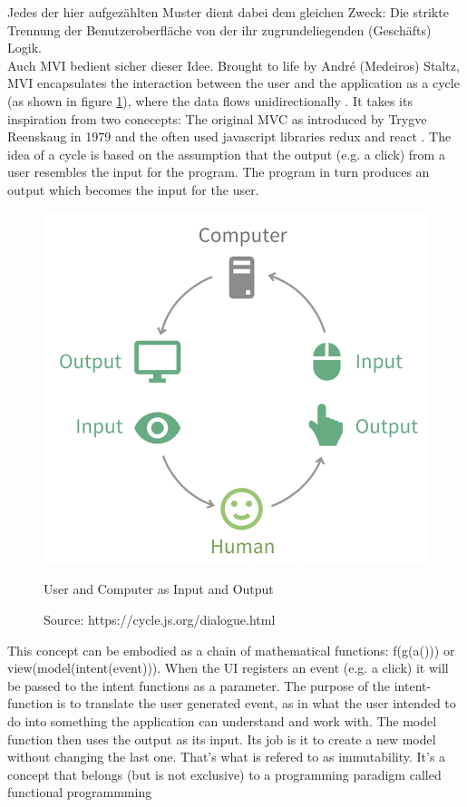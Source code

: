 Jedes der hier aufgezählten Muster dient dabei dem gleichen Zweck: Die strikte Trennung der Benutzeroberfläche von der ihr zugrundeliegenden (Geschäfts) Logik. 
\\
Auch MVI bedient sicher dieser Idee. Brought to life by André (Medeiros) Staltz, MVI encapsulates the interaction between the user and the application as a cycle 
(as shown in figure 
\ref{fig:userComputerInputOutput}), 
where the data flows unidirectionally 
\cite{unidirectionalDataFlowRedux}.
It takes its inspiration from two conecepts: The original MVC as introduced by Trygve Reenskaug in 1979 
\cite{wikipediaTrygveReenskaug} 
and the often used javascript libraries redux 
\cite{redux} 
and react 
\cite{react}. 
The idea of a cycle is based on the assumption that the output (e.g. a click) from a user resembles the input for the program. The program in turn produces an output 
which becomes the input for the user.
\begin{figure}[ht]
    \centering
    \includegraphics[height=0.5\textwidth]{./images/mvi-cycle}
    \caption{User and Computer as Input and Output}
    \caption*{Source: https://cycle.js.org/dialogue.html}
    \label{fig:userComputerInputOutput}
\end{figure}
This concept can be embodied as a chain of mathematical functions: f(g(a())) or view(model(intent(event))).
When the UI registers an event (e.g. a click) it will be passed to the intent functions as a parameter. The purpose of the intent-function is 
to translate the user generated event, as in what the user intended to do into something the application can understand and work with.
The model function then uses the output as its input. Its job is it to create a new model without changing the last one. That's what is refered to as immutability. 
\cite{immutableObjectsEffectiveJava}
It's a concept that belongs (but is not exclusive) to a programming paradigm called functional programmming
